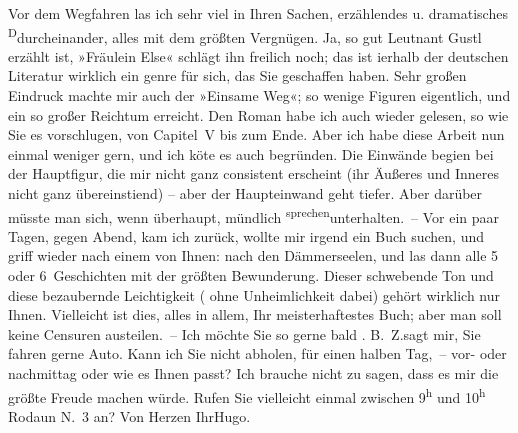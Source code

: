 \pstart
           Vor dem Wegfahren las ich sehr viel in Ihren Sachen, erzählendes u. dramatisches \substVorne{}\textsuperscript{D}\substDazwischen{}d\substHinten{}urcheinander, alles mit dem größten Vergnügen. Ja, so gut Leutnant Gustl erzählt ist, »Fräulein Else« schlägt ihn freilich noch; das ist i{\geminationn}erhalb der deutschen Literatur wirklich ein genre für
               sich, das Sie geschaffen haben. Sehr großen Eindruck machte mir auch der »Einsame Weg«; so wenige Figuren eigentlich, und
               ein so großer Reichtum erreicht. Den Roman habe ich {\pb}auch wieder gelesen, so wie Sie es
               vorschlugen, von Capitel V bis zum Ende. Aber ich habe diese Arbeit nun einmal
               weniger gern, und ich kö{\geminationn}te es auch begründen. Die
               Einwände begi{\geminationn}en bei der Hauptfigur, die mir nicht ganz
               consistent erscheint (ihr Äußeres und Inneres nicht ganz übereinsti{\geminationm}end) – aber der Haupteinwand geht tiefer. Aber darüber
               müsste man sich, wenn überhaupt, mündlich \substVorne{}\textsuperscript{sprechen}\substDazwischen{}unterhalten\substHinten{}. – Vor ein paar Tagen, gegen Abend, kam ich zurück, wollte \introOben{}mir\introOben{} irgend ein Buch suchen, und griff wieder nach einem von
               Ihnen: nach den Dämmerseelen, und las dann alle
               5 oder 6 Geschichten mit der größten Bewunderung. Dieser schwebende Ton und diese
               bezaubernde Leichtigkeit (\damage{\textcolor{gray}{nicht}} ohne Unheimlichkeit dabei) gehört wirklich nur Ihnen. Vielleicht ist dies,
               alles in allem, Ihr meisterhaftestes Buch; aber man soll keine Censuren austeilen. –
               Ich möchte Sie so gerne bald \label{K_L02509-1v}\label{K_L02509-1}. B. Z.sagt mir, Sie fahren gerne Auto. Kann ich Sie nicht
               abholen, für einen halben Tag, – vor- oder nachmittag oder wie es Ihnen passt? Ich
               brauche nicht zu sagen, dass es mir die größte Freude machen würde. Rufen Sie
               vielleicht einmal zwischen 9\textsuperscript{h} und 10\textsuperscript{h}{ }Rodaun N. 3 an? \pend
           \pstart Von Herzen Ihr\spacefill\mbox{Hugo.}\pend{}\endnumbering{}  
      